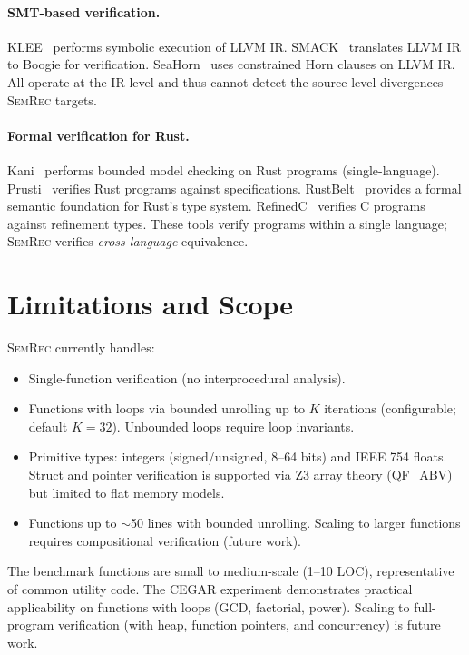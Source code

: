 \documentclass[11pt,a4paper]{article}
\begin{document}
\paragraph{SMT-based verification.}
KLEE~\cite{cadar2008klee} performs symbolic execution of LLVM IR.
SMACK~\cite{rakamaric2014smack} translates LLVM IR to Boogie for
verification.  SeaHorn~\cite{gurfinkel2015seahorn} uses constrained
Horn clauses on LLVM IR.  All operate at the IR level and thus
cannot detect the source-level divergences \textsc{SemRec} targets.

\paragraph{Formal verification for Rust.}
Kani~\cite{kani2022} performs bounded model checking on Rust programs
(single-language).  Prusti~\cite{astrauskas2022prusti} verifies Rust
programs against specifications.  RustBelt~\cite{jung2017rustbelt}
provides a formal semantic foundation for Rust's type system.
RefinedC~\cite{sammler2021refinedc} verifies C programs against
refinement types.  These tools verify programs within a single language;
\textsc{SemRec} verifies \emph{cross-language} equivalence.


\section{Limitations and Scope}\label{sec:limitations}

\textsc{SemRec} currently handles:
\begin{itemize}
  \item Single-function verification (no interprocedural analysis).
  \item Functions with loops via bounded unrolling up to $K$ iterations
    (configurable; default $K=32$).  Unbounded loops require loop invariants.
  \item Primitive types: integers (signed/unsigned, 8--64 bits) and
    IEEE 754 floats.  Struct and pointer verification is supported via
    Z3 array theory (QF\_ABV) but limited to flat memory models.
  \item Functions up to $\sim$50 lines with bounded unrolling.  Scaling
    to larger functions requires compositional verification (future work).
\end{itemize}

The benchmark functions are small to medium-scale (1--10 LOC),
representative of common utility code.  The CEGAR experiment
demonstrates practical applicability on functions with loops
(GCD, factorial, power).  Scaling to full-program verification
(with heap, function pointers, and concurrency) is future work.
\end{document}
